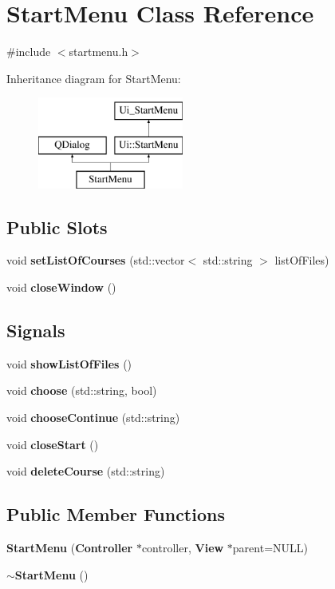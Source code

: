 \section{Start\-Menu Class Reference}
\label{class_start_menu}


{\ttfamily \#include $<$startmenu.\-h$>$}

Inheritance diagram for Start\-Menu\-:\begin{figure}[H]
\begin{center}
\leavevmode
\includegraphics[height=3.000000cm]{class_start_menu}
\end{center}
\end{figure}
\subsection*{Public Slots}
\begin{DoxyCompactItemize}
\item 
void {\bf set\-List\-Of\-Courses} (std\-::vector$<$ std\-::string $>$ list\-Of\-Files)
\item 
void {\bf close\-Window} ()
\end{DoxyCompactItemize}
\subsection*{Signals}
\begin{DoxyCompactItemize}
\item 
void {\bf show\-List\-Of\-Files} ()
\item 
void {\bf choose} (std\-::string, bool)
\item 
void {\bf choose\-Continue} (std\-::string)
\item 
void {\bf close\-Start} ()
\item 
void {\bf delete\-Course} (std\-::string)
\end{DoxyCompactItemize}
\subsection*{Public Member Functions}
\begin{DoxyCompactItemize}
\item 
{\bf Start\-Menu} ({\bf Controller} $\ast$controller, {\bf View} $\ast$parent=N\-U\-L\-L)
\item 
{\bf $\sim$\-Start\-Menu} ()
\end{DoxyCompactItemize}
